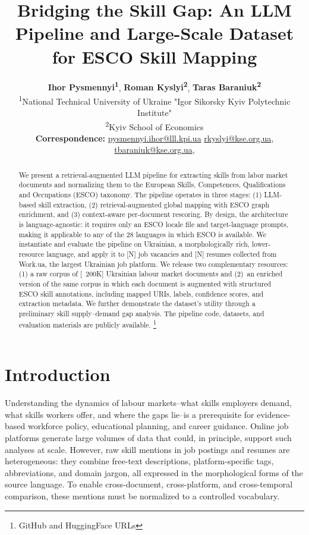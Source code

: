 \documentclass[11pt]{article}
\title{Bridging the Skill Gap: An LLM Pipeline and Large-Scale Dataset for ESCO Skill Mapping
}
\author{
  \textbf{Ihor Pysmennyi\textsuperscript{1}},
  \textbf{Roman Kyslyi\textsuperscript{2}},
  \textbf{Taras Baraniuk\textsuperscript{2}}
\\
\textsuperscript{1}National Technical University of Ukraine "Igor Sikorsky Kyiv Polytechnic Institute" \\
\textsuperscript{2}Kyiv School of Economics
\\
\small{
  \textbf{Correspondence:}   \href{mailto:pysmennyi.ihor@lll.kpi.ua}{pysmennyi.ihor@lll.kpi.ua}
  \href{mailto:rkyslyi@kse.org.ua}{rkyslyi@kse.org.ua}, 
  \href{mailto:tbaraniuk@kse.org.ua}{tbaraniuk@kse.org.ua}, 
}
}
\begin{document}
\maketitle
\begin{abstract}
We present a retrieval-augmented LLM pipeline for extracting skills from labor market documents and normalizing them to the European Skills, Competences, Qualifications and Occupations (ESCO) taxonomy. The pipeline operates in three stages: (1) LLM-based skill extraction, (2) retrieval-augmented global mapping with ESCO graph enrichment, and (3) context-aware per-document rescoring. By design, the architecture is language-agnostic: it requires only an ESCO locale file and target-language prompts, making it applicable to any of the 28 languages in which ESCO is available. We instantiate and evaluate the pipeline on Ukrainian, a morphologically rich, lower-resource language, and apply it to [N] job vacancies and [N] resumes collected from Work.ua, the largest Ukrainian job platform. We release two complementary resources: (1) a raw corpus of [~200K] Ukrainian labour market documents and (2)~an enriched version of the same corpus in which each document is augmented with structured ESCO skill annotations, including mapped URIs, labels, confidence scores, and extraction metadata. We further demonstrate the dataset’s utility through a preliminary skill supply–demand gap analysis. The pipeline code, datasets, and evaluation materials are publicly available.
\footnote{{GitHub and HuggingFace URLs}}

\end{abstract}

\section{Introduction}

Understanding the dynamics of labour markets--what skills employers demand, what skills workers offer, and where the gaps lie--is a prerequisite for evidence-based workforce policy, educational planning, and career guidance. Online job platforms generate large volumes of data that could, in principle, support such analyses at scale. However, raw skill mentions in job postings and resumes are heterogeneous: they combine free-text descriptions, platform-specific tags, abbreviations, and domain jargon, all expressed in the morphological forms of the source language. To enable cross-document, cross-platform, and cross-temporal comparison, these mentions must be normalized to a controlled vocabulary.
\end{document}
